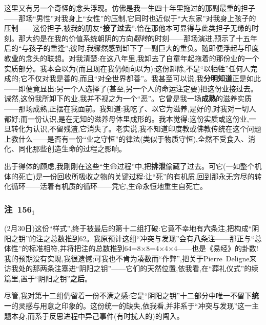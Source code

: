 这里又有另一个奇怪的念头浮现。仿佛是我一生四十年里拖过的那副最重的担子——那场“男性”对我身上“女性”的压制,它同时也近似于“大东家”对我身上孩子的压制——这份担子,被我的朋友“\textbf{接了过去}”\dmark{}:恰在那他本可显得与此类担子无缘的时刻。那大约是在我的价值系统朝阴的方向\emph{翻转}的时刻——那场演进,预示了十五年后的“与孩子的重逢”;彼时,我骤然感到卸下了一副巨大的重负。随即便浮起与印度教\textbf{业}的念头的联想。对我清楚:在这八年里,我卸去了自童年起拖着的那份业的一个实质部分。我本会以为(而且现在我仍倾向以为):这份卸除,不是“以牺牲”任何人完成的;它不仅对我是善的,而且“对全世界都善”。我甚至可以说,我\textbf{分明知道}正是如此——即便竟显出:另一个人选择了(甚至,另一个人的命运注定要)把这份业接过去。诚然,这份我所卸下的业,我并不视之为一个“恶”。它曾是我一场\textbf{成熟}的滋养实质——那场成熟,正摆在我面前。我知道:我吃了、以它为滋养,是好的,对我对一切人都好;而一份认识,是在无知的滋养母体里成形的。我本觉得:这份实质或这份业,一旦转化为认识,不留残渣,它消失了。老实说,我不知道印度教或佛教传统在这个问题上教什么——是否有一份“业之守恒”的律法(类似于物质守恒),全然不受食入、消化、同化那些创造生命的过程之影响。

出于得体的顾虑,我刚刚在这些“生命过程”中,把\textbf{排泄}偷藏了过去。可它(一如整个机体的死亡)是一份回收所吸收之物的关键过程:让“死”的有机质,回到那永无穷尽的转化循环——活着有机质的循环——凭它,生命永恒地重生自死亡。

\subsubsection*{注~156$_{1}$}
\label{ch18:local:n65}

(2月30日)这份“样式”,终于被最后的第十二组打破:它竟不幸地有\dmark{}\textbf{六}条注,把构成“阴阳之钥”的注之总数推到62。我原预计这组“冲突与发现”会有\textbf{八}条注——那正与“总体性”的标准相符,并将把注的总数推到64=8×8=4×4×4——也是《易经》的卦数!我的预期没有实现,我很遗憾;可我也不肯为凑数而“作弊”,把关于Pierre~Deligne来访我处的那两条注塞进“阴阳之钥”——它们的天然位置,依我看,在“葬礼仪式”的续篇里,置于“阴阳之钥”\textbf{之后}。

尽管,我对第十二组仍留着一份不满之感:它是“阴阳之钥”十二部分中唯一不留下\textbf{统一}的灵感与用意之印象的。这份统一的缺失,依我看,并非系于“冲突与发现”这一主题本身,而系于反思进程中异己事件(有时扰人的)的闯入。

